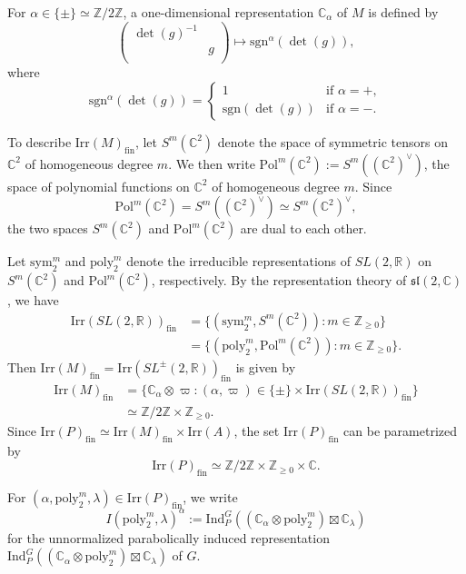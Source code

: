\documentclass[reqno,11pt]{amsart}
\theoremstyle{remark}
\numberwithin{equation}{section}
\newcommand{\ga}{\alpha}
\newcommand{\f}{\mathfrak}
\newcommand{\R}{\mathbb{R}}
\newcommand{\C}{\mathbb{C}}
\newcommand{\Z}{\mathbb{Z}}
\newcommand{\Ind}{\mathrm{Ind}}
\newcommand{\Pol}{\mathrm{Pol}}
\newcommand{\poly}{\mathrm{poly}}
\newcommand{\Irr}{\mathrm{Irr}}
\newcommand{\fin}{\mathrm{fin}}
\newcommand{\sym}{\mathrm{sym}}
\newcommand{\sgn}{\mathrm{sgn}}
\begin{document}
For $\alpha \in \{\pm\}\simeq \Z/2\Z$, 
a one-dimensional representation $\C_\alpha$ of $M$ 
is defined  by
\begin{equation*}
\begin{pmatrix}
\det(g)^{-1} &\\
& g\\
\end{pmatrix}
\longmapsto
\sgn^\alpha(\det(g)),
\end{equation*}
where
\begin{equation*}
\sgn^\alpha(\det(g)) 
= 
\begin{cases}
1 & \text{if $\alpha=+$},\\
\sgn(\det(g)) & \text{if $\alpha=-$}.
\end{cases}
\end{equation*}

To describe $\Irr(M)_{\fin}$,
let $S^m(\C^2)$ denote the space of symmetric tensors on $\C^2$ of homogeneous 
degree $m$. We then write $\Pol^m(\C^2) := S^m((\C^2)^\vee)$,  the space of polynomial functions on $\C^2$ of homogeneous degree $m$.
Since
\begin{equation}\label{eqn:dualsym}
\Pol^m(\C^2) = S^m((\C^2)^\vee)\simeq S^m(\C^2)^\vee, 
\end{equation}
the two spaces $S^m(\C^2)$ and $\Pol^m(\C^2)$ are dual to each other.

Let 
$\sym_2^m$ and $\poly_2^m$ denote 
the irreducible representations of $SL(2,\R)$  on $S^m(\C^2)$ and $\Pol^m(\C^2)$,
respectively. By the representation theory of $\f{sl}(2,\C)$, we have
\begin{align*}
\Irr(SL(2,\R))_\fin 
&= \{(\sym_2^m, S^m(\C^2)): m \in  \Z_{\geq 0}\}\\
&= \{(\poly_2^m, \Pol^m(\C^2)): m \in  \Z_{\geq 0}\}.
\end{align*}
Then $\Irr(M)_\fin = \Irr(SL^{\pm}(2,\R))_\fin$ is given by
\begin{align*}
\Irr(M)_{\fin}
&=
\{\C_\alpha \otimes \varpi: 
(\alpha, \varpi) \in \{\pm\} \times \Irr(SL(2,\R))_{\fin}\}\\
&
\simeq
\Z/2\Z \times \Z_{\geq 0}.
\end{align*}
Since $\Irr(P)_{\fin}\simeq \Irr(M)_{\fin} \times \Irr(A)$, the set $\Irr(P)_\fin$ can be 
parametrized by
\begin{equation*}
\Irr(P)_{\fin}\simeq 
\Z/2\Z \times \Z_{\geq 0} \times \C.
\end{equation*}

For $(\ga, \poly_2^m, \lambda) \in
\Irr(P)_{\fin}$,
we write
\begin{equation}\label{eqn:Ind}
I(\poly_2^m,\lambda)^\ga 
:= 
\Ind_{P}^G\left((\C_\ga \otimes \poly_2^m)\boxtimes \C_\lambda\right)
\end{equation}
for the unnormalized parabolically induced representation 
$\Ind_{P}^G\left((\C_\ga \otimes \poly_2^m)\boxtimes \C_\lambda \right)$ 
of $G$.
\end{document}

